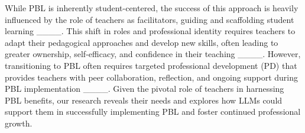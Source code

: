 While PBL is inherently student-centered, the success of this approach is heavily influenced by the role of teachers as facilitators, guiding and scaffolding student learning
____. This shift in roles and professional identity requires teachers to adapt their pedagogical approaches and develop new skills, often leading to greater ownership, self-efficacy, and confidence in their teaching ____. However, transitioning to PBL often requires targeted professional development (PD) that provides teachers with peer collaboration, reflection, and ongoing support during PBL implementation ____. %
Given the pivotal role of teachers in harnessing PBL benefits, our research reveals their needs and explores how LLMs could support them in successfully implementing PBL and foster continued professional growth. 


